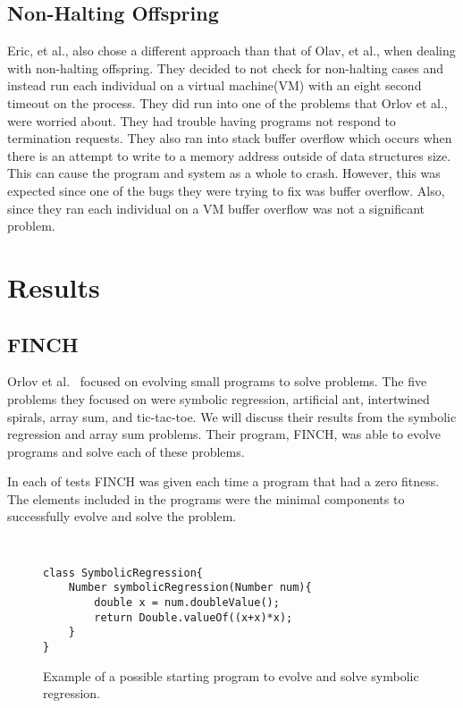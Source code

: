 \documentclass{sig-alternate}
\begin{document}
\subsection{Non-Halting Offspring}

Eric, et al., also chose a different approach than that of Olav, et al., when dealing with non-halting offspring. They decided to not check for non-halting cases and instead run each individual on a virtual machine(VM) with an eight second timeout on the process. They did run into one of the problems that Orlov et al., were worried about. They had trouble having programs not respond to termination requests.
They also ran into stack buffer overflow which occurs when there is an attempt to write to a memory address outside of data structures size. This can cause the program and system as a whole to crash. However, this was expected since one of the bugs they were trying to fix was buffer overflow. Also, since they ran each individual on a VM buffer overflow was not a significant problem.




\section{Results}
\subsection{FINCH}
Orlov et al.~\cite{FINCH:2011} focused on evolving small programs to solve problems. The five problems they focused on were symbolic regression, artificial ant, intertwined spirals, array sum, and tic-tac-toe. We will discuss their results from the symbolic regression and array sum problems. Their program, FINCH, was able to evolve programs and solve each of these problems.

In each of tests FINCH was given each time a program that had a zero fitness. The elements included in the programs were the minimal components to successfully evolve and solve the problem.

\begin{figure}
\centering
{\tt
\begin{verbatim}
class SymbolicRegression{
    Number symbolicRegression(Number num){
        double x = num.doubleValue();
        return Double.valueOf((x+x)*x);
    }
}
\end{verbatim}
}
\caption{Example of a possible starting program to evolve and solve symbolic regression.}
\label{regression}
\end{figure}
\end{document}
